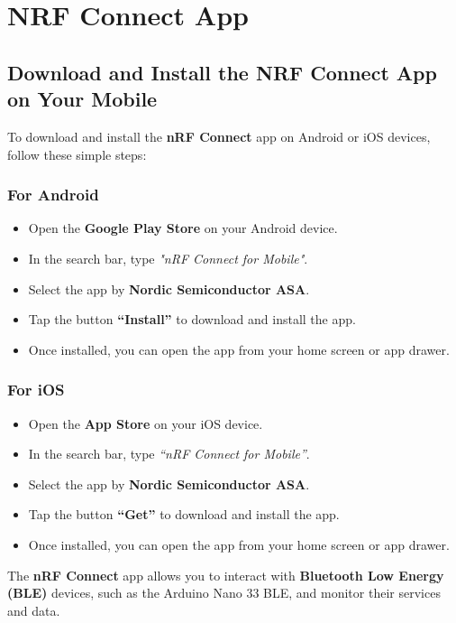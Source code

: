 %
%



\chapter{NRF Connect App}
\label{chap:list_of_items}


\section{Download and Install the NRF Connect App on Your Mobile}

To download and install the \textbf{nRF Connect} app on Android or iOS devices, follow these simple steps:

\subsection{For Android}

\begin{itemize}
	\item Open the \textbf{Google Play Store} on your Android device.
	\item In the search bar, type \textit{"nRF Connect for Mobile"}.
	\item Select the app by \textbf{Nordic Semiconductor ASA}.
	\item Tap the button \textbf{``Install''} to download and install the app.
	\item Once installed, you can open the app from your home screen or app drawer.
\end{itemize}


\subsection{For iOS}

\begin{itemize}
	\item Open the \textbf{App Store} on your iOS device.
	\item In the search bar, type \textit{``nRF Connect for Mobile''}.
	\item Select the app by \textbf{Nordic Semiconductor ASA}.
	\item Tap the button \textbf{``Get''} to download and install the app.
	\item Once installed, you can open the app from your home screen or app drawer.
\end{itemize}\noindent The \textbf{nRF Connect} app allows you to interact with \textbf{Bluetooth Low Energy (BLE)} devices, such as the Arduino Nano 33 BLE, and monitor their services and data.


